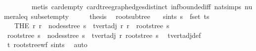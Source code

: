 \begin{isabellebody}
\ \ \ \ \ \ \ \ metis\ card{\isachardot}{\kern0pt}empty\ card{\isacharunderscore}{\kern0pt}tree{\isacharunderscore}{\kern0pt}graph{\isacharunderscore}{\kern0pt}edges{\isacharunderscore}{\kern0pt}distinct\ inf{\isachardot}{\kern0pt}bounded{\isacharunderscore}{\kern0pt}iff\ nat{\isachardot}{\kern0pt}simps{\isacharparenleft}{\kern0pt}{}{\isacharparenright}{\kern0pt}\ numeral{\isacharunderscore}{\kern0pt}{}{\isacharunderscore}{\kern0pt}eq{\isacharunderscore}{\kern0pt}{}\ subset{\isacharunderscore}{\kern0pt}empty{\isacharparenright}{\kern0pt}\isanewline
\ \ \isamarkupfalse%
\ \isamarkupfalse%
\ {\isacharquery}{\kern0pt}thesis\ \isacommand{{\isachardot}{\kern0pt}}\isamarkupfalse%
\isanewline
{}\isamarkupfalse%
%
\endisatagproof
{\isafoldproof}%
%
\isadelimproof
\isanewline
%
\endisadelimproof
\isanewline
{}\isamarkupfalse%
\ root{\isacharunderscore}{\kern0pt}subtree{\isacharcolon}{\kern0pt}\isanewline
\ \ \ s{\isacharunderscore}{\kern0pt}in{\isacharunderscore}{\kern0pt}ts{\isacharcolon}{\kern0pt}\ {\isachardoublequoteopen}s\ {\isasymin}\ fset\ ts{\isachardoublequoteclose}\isanewline
\ \ \ {\isachardoublequoteopen}{\isacharparenleft}{\kern0pt}THE\ r{\isacharprime}{\kern0pt}{\isachardot}{\kern0pt}\ r{\isacharprime}{\kern0pt}\ {\isasymin}\ {\isacharparenleft}{\kern0pt}nodes{\isacharunderscore}{\kern0pt}stree\ s{\isacharparenright}{\kern0pt}\ {\isasymand}\ t{\isachardot}{\kern0pt}vert{\isacharunderscore}{\kern0pt}adj\ r\ r{\isacharprime}{\kern0pt}{\isacharparenright}{\kern0pt}\ {\isacharequal}{\kern0pt}\ root{\isacharunderscore}{\kern0pt}stree\ s{\isachardoublequoteclose}\isanewline
%
\isadelimproof
%
\endisadelimproof
%
\isatagproof
{}\isamarkupfalse%
\isanewline
\ \ \isamarkupfalse%
\ {\isachardoublequoteopen}root{\isacharunderscore}{\kern0pt}stree\ s\ {\isasymin}\ nodes{\isacharunderscore}{\kern0pt}stree\ s\ {\isasymand}\ t{\isachardot}{\kern0pt}vert{\isacharunderscore}{\kern0pt}adj\ r\ {\isacharparenleft}{\kern0pt}root{\isacharunderscore}{\kern0pt}stree\ s{\isacharparenright}{\kern0pt}{\isachardoublequoteclose}\ \isamarkupfalse%
\ t{\isachardot}{\kern0pt}vert{\isacharunderscore}{\kern0pt}adj{\isacharunderscore}{\kern0pt}def\ \isamarkupfalse%
\ t\ root{\isacharunderscore}{\kern0pt}stree{\isacharunderscore}{\kern0pt}wf\ s{\isacharunderscore}{\kern0pt}in{\isacharunderscore}{\kern0pt}ts\ \isamarkupfalse%
\ auto\isanewline
{}\isamarkupfalse%

\end{isabellebody}
